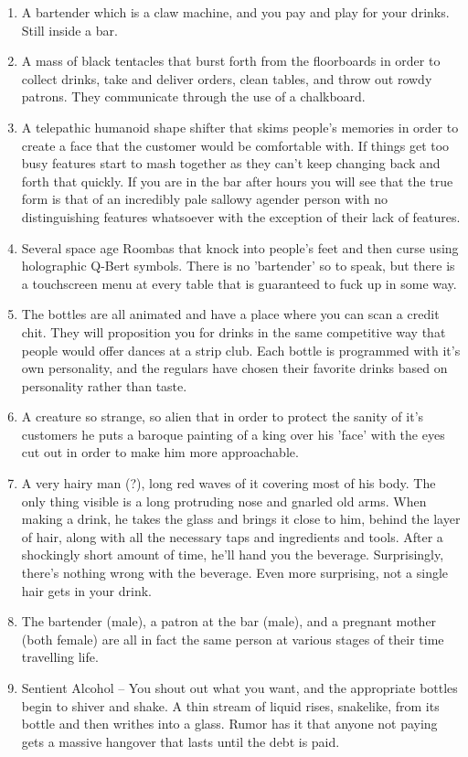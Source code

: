 \documentclass{article}
\begin{document}
\begin{enumerate}
	\item A bartender which is a claw machine, and you pay and play for your drinks. Still inside a bar.
	\item A mass of black tentacles that burst forth from the floorboards in order to collect drinks, take and deliver orders, clean tables, and throw out rowdy patrons. They communicate through the use of a chalkboard.
	\item A telepathic humanoid shape shifter that skims people's memories in order to create a face that the customer would be comfortable with. If things get too busy features start to mash together as they can't keep changing back and forth that quickly. If you are in the bar after hours you will see that the true form is that of an incredibly pale sallowy agender person with no distinguishing features whatsoever with the exception of their lack of features.
	\item Several space age Roombas that knock into people's feet and then curse using holographic Q-Bert symbols. There is no 'bartender' so to speak, but there is a touchscreen menu at every table that is guaranteed to fuck up in some way.
	\item The bottles are all animated and have a place where you can scan a credit chit. They will proposition you for drinks in the same competitive way that people would offer dances at a strip club. Each bottle is programmed with it's own personality, and the regulars have chosen their favorite drinks based on personality rather than taste.
	\item A creature so strange, so alien that in order to protect the sanity of it's customers he puts a baroque painting of a king over his 'face' with the eyes cut out in order to make him more approachable.
	\item A very hairy man (?), long red waves of it covering most of his body. The only thing visible is a long protruding nose and gnarled old arms. When making a drink, he takes the glass and brings it close to him, behind the layer of hair, along with all the necessary taps and ingredients and tools. After a shockingly short amount of time, he'll hand you the beverage. Surprisingly, there's nothing wrong with the beverage. Even more surprising, not a single hair gets in your drink.
	\item The bartender (male), a patron at the bar (male), and a pregnant mother (both female) are all in fact the same person at various stages of their time travelling life.
	\item Sentient Alcohol – You shout out what you want, and the appropriate bottles begin to shiver and shake. A thin stream of liquid rises, snakelike, from its bottle and then writhes into a glass. Rumor has it that anyone not paying gets a massive hangover that lasts until the debt is paid.

\end{enumerate}
\end{document}
